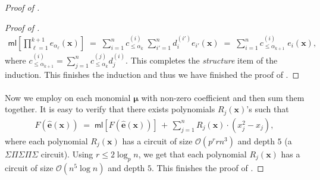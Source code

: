 \documentclass[11pt]{article}
\newcommand{\bigO}{\mathcal{O}}
\newcommand{\brac}[1]{\left[ #1 \right]}
\newcommand{\F}{\mathbb{F}}
\newcommand{\ml}{\mathsf{ml}}
\begin{document}
\begin{proof}[Proof of ]
\begin{proof}[Proof of ]
\begin{align*}
    \ml\brac{\prod_{\ell = 1}^{k+1} e_{\alpha_{\ell}}(\mathbf{x})} \; = \; \sum_{i = 1}^{n} c_{\leq \alpha_{k}}^{(i)} \; \sum_{i'=1}^{n} d_{i}^{(i')} e_{i'}(\mathbf{x}) \; = \; \sum_{i = 1}^{n} c_{\leq \alpha_{k+1}}^{(i)} \; e_{i}(\mathbf{x}),
\end{align*}
where $c_{\leq \alpha_{k+1}}^{(i)} = \sum_{j=1}^{n} c_{\leq \alpha_{k}}^{(j)} d_{j}^{(i)}$. This completes the \emph{structure} item of the induction.\newline
This finishes the induction and thus we have finished the proof of .
\end{proof}

\paragraph{}Now we employ  on each monomial $\bm{\mu}$ with non-zero coefficient and then sum them together. It is easy to verify that there exists polynomials $R_{j}(\mathbf{x})$'s such that
\begin{align*}
    F(\widehat{\mathbf{e}}(\mathbf{x})) \; = \; \ml[F(\widehat{\mathbf{e}}(\mathbf{x}))] \, + \, \sum_{j=1}^{n} R_{j}(\mathbf{x}) \cdot (x_{j}^{2} - x_{j}),
\end{align*}
where each polynomial $R_{j}(\mathbf{x})$ has a circuit of size $\bigO(p^{r} r 
 n^{3})$ and depth $5$ (a $\Sigma \Pi \Sigma \Pi \Sigma$ circuit). Using $r \leq 2 \log_{p} n$, we get that each polynomial $R_{j}(\mathbf{x})$ has a circuit of size $\bigO(n^{5} \log n)$ and depth $5$. This finishes the proof of .
\end{proof}


\medskip

\printbibliography[
heading=bibintoc,
title={References}
]

\appendix

\end{document}
